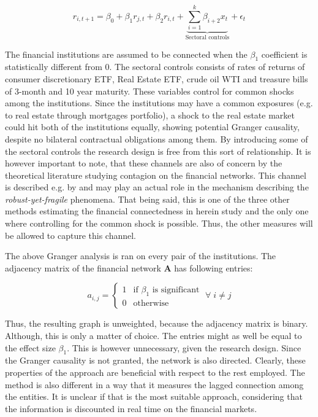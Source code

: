 \documentclass[12pt]{article}
\begin{document}
\begin{equation}
	r_{i,t+1} = \beta_0 + \beta_1 r_{j,t} + \beta_2 r_{i, t} + \underbrace{\sum_{i=1}^{k} \beta_{i+2} x_{t}}_{\text{Sectoral controls}} + \epsilon_t
\end{equation}

The financial institutions are assumed to be connected when the $\beta_1$ coefficient is statistically different from 0. The sectoral controls consists of rates of returns of consumer discretionary ETF, Real Estate ETF, crude oil WTI and treasure bills of 3-month and 10 year maturity. These variables control for common shocks among the institutions. Since the institutions may have a common exposures (e.g. to real estate through mortgages portfolio), a shock to the real estate market could hit both of the institutions equally, showing potential Granger causality, despite no bilateral contractual obligations among them. By introducing some of the sectoral controls the research design is free from this sort of relationship. It is however important to note, that these channels are also of concern by the theoretical literature studying contagion on the financial networks. This channel is described e.g. by \cite{cifuentes05} and may play an actual role in the mechanism describing the \textit{robust-yet-fragile} phenomena. That being said, this is one of the three other methods estimating the financial connectedness in herein study and the only one where controlling for the common shock is possible. Thus, the other measures will be allowed to capture this channel. 

The above Granger analysis is ran on every pair of the institutions. The adjacency matrix of the financial network $\boldsymbol{A}$ has following entries:

\begin{equation}
	a_{i,j} = \begin{cases}
		1  & \text{if } \beta_1 \text{ is significant} \\
		0 & \text{otherwise}
	\end{cases} \; \forall \; i \neq j
\end{equation}

Thus, the resulting graph is unweighted, because the adjacency matrix is binary. Although, this is only a matter of choice. The entries might as well be equal to the effect size $\beta_1$. This is however unnecessary, given the research design. Since the Granger causality is not granted, the network is also directed. Clearly, these properties of the approach are beneficial with respect to the rest employed. The method is also different in a way that it measures the lagged connection among the entities. It is unclear if that is the most suitable approach, considering that the information is discounted in real time on the financial markets. 
\end{document}
